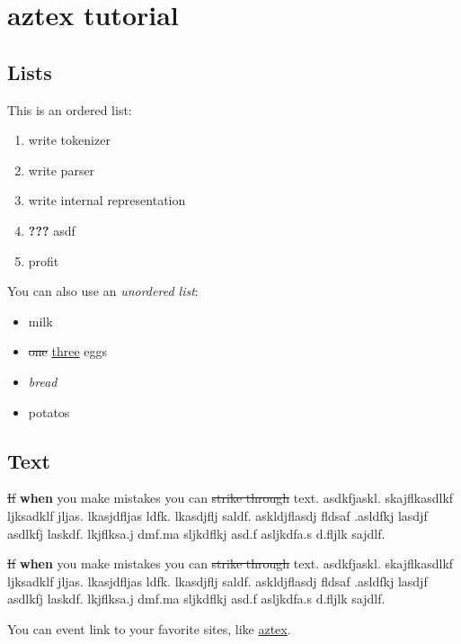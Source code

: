 \documentclass{article}
\begin{document}
\section{aztex tutorial}

\subsection{Lists}

This is an ordered list:

\begin{enumerate}
\item write tokenizer
\item write parser
\item write internal representation
\item \textbf{???} asdf
\item profit
\end{enumerate}

You can also use an \textit{unordered list}:

\begin{itemize}
\item milk
\item \sout{one} \underline{three} eggs
\item \textit{bread}
\item potatos
\end{itemize}

\subsection{Text}

\sout{If} \textbf{when} you make mistakes you can \sout{strike through} text. asdkfjaskl. skajflkasdlkf ljksadklf jljas. lkasjdfljas ldfk. lkasdjflj saldf. askldjflasdj fldsaf .asldfkj lasdjf asdlkfj laskdf. lkjflksa.j dmf.ma sljkdflkj asd.f asljkdfa.s d.fljlk sajdlf.

\sout{If} \textbf{when} you make mistakes you can \sout{strike through} text. asdkfjaskl. skajflkasdlkf ljksadklf jljas. lkasjdfljas ldfk. lkasdjflj saldf. askldjflasdj fldsaf .asldfkj lasdjf asdlkfj laskdf. lkjflksa.j dmf.ma sljkdflkj asd.f asljkdfa.s d.fljlk sajdlf.

You can event link to your favorite sites, like \href{http://github.com/thuc289/azTex}{aztex}.
\end{document}

